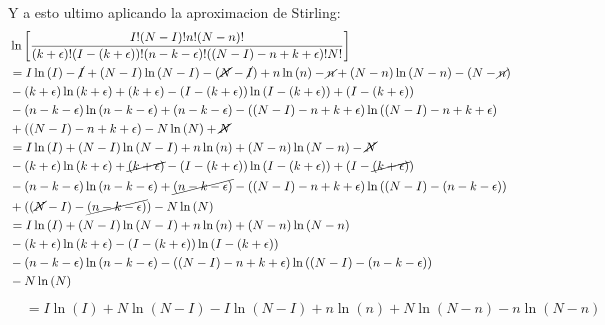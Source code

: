 \documentclass[a4paper]{article}
\begin{document}
\begin{answer}[punto ]
        Y a esto ultimo aplicando la aproximacion de Stirling:
        \begin{align*}
            &\ln \left[
            \frac{I!(N-I)!n!(N-n)!}{(k + \epsilon)!(I - (k+\epsilon))!(n - k-\epsilon)!((N-I) - n + k+\epsilon)!N!}
            \right] \\
            &= I \ln \left(I\right) - \cancel I + ( N-I) \ln \left(N-I\right) - (\cancel N-\cancel I) + n \ln \left(n\right) - \cancel n + (N-n) \ln \left(N-n\right) - (N-\cancel n) \\
            &- (k + \epsilon) \ln \left(k + \epsilon\right) + (k + \epsilon) - (I - (k+\epsilon)) \ln \left(I - (k+\epsilon)\right) + (I - (k+\epsilon)) \\
            &- (n - k-\epsilon) \ln \left(n - k-\epsilon\right) + (n - k-\epsilon) - ((N-I) - n + k+\epsilon) \ln \left((N-I) - n + k+\epsilon\right) \\
            &+ ((N-I) - n + k+\epsilon) - N \ln \left(N\right) +\cancel N \\
            &= I \ln \left(I\right)  + ( N-I) \ln \left(N-I\right) + n \ln \left(n\right)  + (N-n) \ln \left(N-n\right) - \cancel N \\
            &- (k + \epsilon) \ln \left(k + \epsilon\right) + \cancel{(k + \epsilon)} - (I - (k+\epsilon)) \ln \left(I - (k+\epsilon)\right) + (I - \cancel{(k+\epsilon)}) \\
            &- (n - k-\epsilon) \ln \left(n - k-\epsilon\right) + \cancel{(n - k-\epsilon)} - ((N-I) - n + k+\epsilon) \ln \left((N-I) - (n - k-\epsilon)\right) \\
            &+ ((\cancel N-I) -\cancel{(n - k-\epsilon)}) - N \ln \left(N\right)  \\
            &= I \ln \left(I\right)  + ( N-I) \ln \left(N-I\right) + n \ln \left(n\right)  + (N-n) \ln \left(N-n\right)\\
            &- (k + \epsilon) \ln \left(k + \epsilon\right)  - (I - (k+\epsilon)) \ln \left(I - (k+\epsilon)\right)  \\
            &- (n - k-\epsilon) \ln \left(n - k-\epsilon\right) - ((N-I) - n + k+\epsilon) \ln \left((N-I) - (n - k-\epsilon)\right) \\
            & - N \ln \left(N\right) \\
        \end{align*}
        \begin{align*}
            &= I \ln \left(I\right)  + N\ln \left(N-I\right)-I\ln \left(N-I\right) + n \ln \left(n\right)  + N\ln \left(N-n\right)-n\ln \left(N-n\right)\\

\end{align*}
\end{answer}
\end{document}
